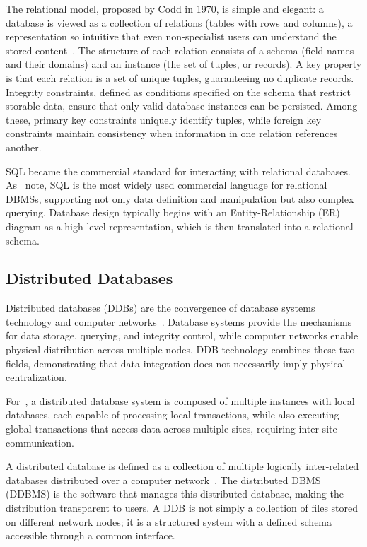 The relational model, proposed by Codd in 1970, is simple and elegant: a database is viewed
as a collection of relations (tables with rows and columns), a representation so intuitive
that even non-specialist users can understand the stored content~\citep{Ramakrishnan2003}.
The structure of each relation consists of a schema (field names and their domains) and an
instance (the set of tuples, or records). A key property is that each relation is a set of
unique tuples, guaranteeing no duplicate records. Integrity constraints, defined as conditions specified
on the schema that restrict storable data, ensure that only valid database instances can
be persisted. Among these, primary key constraints uniquely identify tuples, while foreign key
constraints maintain consistency when information in one relation references another.

SQL became the commercial standard for interacting with relational databases.
As~\cite{Ramakrishnan2003} note, SQL is the most widely used commercial language for
relational DBMSs, supporting not only data definition and manipulation but also complex
querying. Database design typically begins with an Entity-Relationship (ER) diagram as a
high-level representation, which is then translated into a relational schema.

\subsection{Distributed Databases}

Distributed databases (DDBs) are the convergence of database systems technology and computer networks~\citep{Ozsu2011}. Database systems provide the mechanisms for data storage, querying, and integrity control,
while computer networks enable physical distribution across multiple nodes. DDB technology
combines these two fields, demonstrating that data integration does not necessarily imply
physical centralization.

For~\cite{Silberschatz2020}, a distributed database system is composed of multiple instances
with local databases, each capable of processing local transactions, while also executing
global transactions that access data across multiple sites, requiring inter-site communication.

A distributed database is defined as a collection of multiple logically inter-related databases
distributed over a computer network~\citep{Ozsu2011}. The distributed DBMS (DDBMS) is the
software that manages this distributed database, making the distribution transparent to users.
A DDB is not simply a collection of files stored on different network nodes; it is a structured
system with a defined schema accessible through a common interface.

